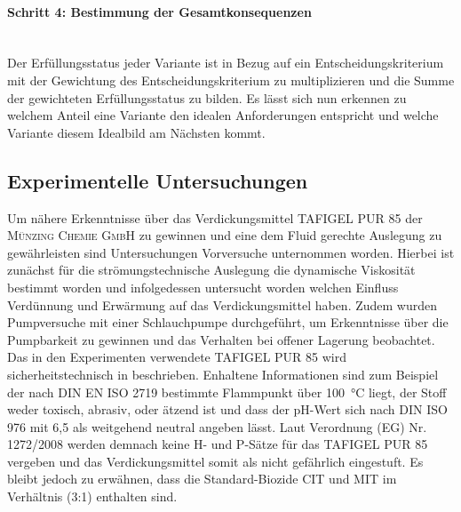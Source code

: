 \paragraph{Schritt 4: Bestimmung der Gesamtkonsequenzen} \, \\
Der Erfüllungsstatus jeder Variante ist in Bezug auf ein Entscheidungskriterium mit der Gewichtung des Entscheidungskriterium zu multiplizieren und die Summe der gewichteten Erfüllungsstatus zu bilden. Es lässt sich nun erkennen zu welchem Anteil eine Variante den idealen Anforderungen entspricht und welche Variante diesem Idealbild am Nächsten kommt. 


 

\subsection{Experimentelle Untersuchungen}
Um nähere Erkenntnisse über das Verdickungsmittel TAFIGEL PUR 85 der \textsc{Münzing Chemie GmbH} zu gewinnen und eine dem Fluid gerechte Auslegung zu gewährleisten sind Untersuchungen Vorversuche unternommen worden. Hierbei ist zunächst für die strömungstechnische Auslegung die dynamische Viskosität bestimmt worden und infolgedessen untersucht worden welchen Einfluss Verdünnung und Erwärmung auf das Verdickungsmittel haben. Zudem wurden Pumpversuche mit einer Schlauchpumpe durchgeführt, um Erkenntnisse über die Pumpbarkeit zu gewinnen und das Verhalten bei offener Lagerung beobachtet.\linebreak
Das in den Experimenten verwendete TAFIGEL PUR 85 wird sicherheitstechnisch in \cite{MunzingChemieGmbH.2020} beschrieben. Enhaltene Informationen sind zum Beispiel der nach DIN EN ISO 2719 bestimmte Flammpunkt über \SI{100}{\celsius} liegt, der Stoff weder toxisch, abrasiv, oder ätzend ist und dass der pH-Wert sich nach DIN ISO 976 mit 6,5 als weitgehend neutral angeben lässt. Laut Verordnung (EG) Nr. 1272/2008 werden demnach keine H- und P-Sätze für das TAFIGEL PUR 85 vergeben und das Verdickungsmittel somit als nicht gefährlich eingestuft. Es bleibt jedoch zu erwähnen, dass die Standard-Biozide CIT und MIT im Verhältnis (3:1) enthalten sind.

